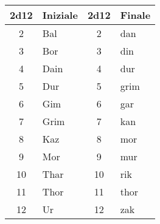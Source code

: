 \begin{multicols}{2}
{\noindent\begin{tabular}{c|l|c|l}
	\toprule
\textbf{2d12} & \textbf{Iniziale} & \textbf{2d12} & \textbf{Finale} \\
\toprule
2 & Bal & 2 & dan \\
3 & Bor & 3 & din \\
4 & Dain & 4 & dur \\
5 & Dur & 5 & grim \\
6 & Gim & 6 & gar \\
7 & Grim & 7 & kan \\
8 & Kaz & 8 & mor \\
9 & Mor & 9 & mur \\
10 & Thar & 10 & rik \\
11 & Thor & 11 & thor \\
12 & Ur & 12 & zak \\

\end{tabular}



%
%

%
%


}
\end{multicols}
